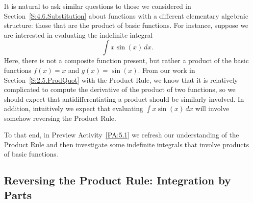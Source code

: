 It is natural to ask similar questions to those we considered in Section~\ref{S:4.6.Substitution} about functions with a different elementary algebraic structure:  those that are the product of basic functions.  For instance, suppose we are interested in evaluating the indefinite integral
$$\int x \sin(x) \, dx.$$
Here, there is not a composite function present, but rather a product of the basic functions $f(x) = x$ and $g(x) = \sin(x)$.  From our work in Section~\ref{S:2.5.ProdQuot} with the Product Rule, we know that it is relatively complicated to compute the derivative of the product of two functions, so we should expect that antidifferentiating a product should be similarly involved.  In addition, intuitively we expect that evaluating $\int x \sin(x) \, dx$ will involve somehow reversing the Product Rule.

To that end, in Preview Activity~\ref{PA:5.1} we refresh our understanding of the Product Rule and then investigate some indefinite integrals that involve products of basic functions.


\subsection*{Reversing the Product Rule: Integration by Parts} 

